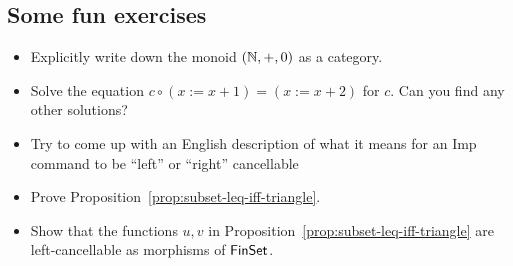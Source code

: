 


\subsection{Some fun exercises}

\begin{itemize}
\item Explicitly write down the monoid \((\mathbb N,+,0)\) as a category.
\item Solve the equation \(c \circ (x := x + 1) = (x := x + 2)\) for \(c\).
  Can you find any other solutions?
\item Try to come up with an English description of what it means for an Imp command to be ``left'' or ``right'' cancellable
\item Prove Proposition~\ref{prop:subset-leq-iff-triangle}.
\item Show that the functions \(u,v\) in Proposition~\ref{prop:subset-leq-iff-triangle}
  are left-cancellable as morphisms of \(\mathsf{FinSet}\).
\end{itemize}

